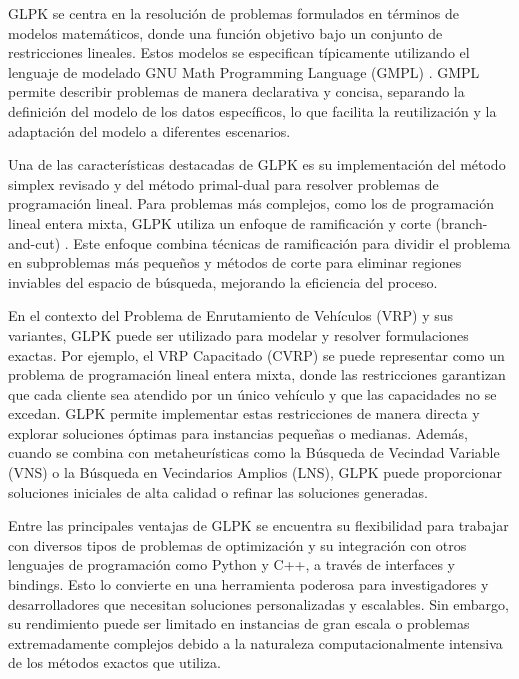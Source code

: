 \documentclass[12pt]{article}
\begin{document}
GLPK se centra en la resolución de problemas formulados en términos de modelos matemáticos, donde una función objetivo  bajo un conjunto de restricciones lineales. Estos modelos se especifican típicamente utilizando el lenguaje de modelado GNU Math Programming Language (GMPL) \agregaesto{[REF]}. GMPL permite describir problemas de manera declarativa y concisa, separando la definición del modelo de los datos específicos, lo que facilita la reutilización y la adaptación del modelo a diferentes escenarios.

Una de las características destacadas de GLPK es su implementación del método simplex revisado y del método primal-dual para resolver problemas de programación lineal. Para problemas más complejos, como los de programación lineal entera mixta, GLPK utiliza un enfoque de ramificación y corte (branch-and-cut) \agregaesto{[REF]}. Este enfoque combina técnicas de ramificación para dividir el problema en subproblemas más pequeños y métodos de corte para eliminar regiones inviables del espacio de búsqueda, mejorando la eficiencia del proceso.


En el contexto del Problema de Enrutamiento de Vehículos (VRP) y sus variantes, GLPK puede ser utilizado para modelar y resolver formulaciones exactas. Por ejemplo, el VRP Capacitado (CVRP) se puede representar como un problema de programación lineal entera mixta, donde las restricciones garantizan que cada cliente sea atendido por un único vehículo y que las capacidades no se excedan. GLPK permite implementar estas restricciones de manera directa y explorar soluciones óptimas para instancias pequeñas o medianas. Además, cuando se combina con metaheurísticas como la Búsqueda de Vecindad Variable (VNS) o la Búsqueda en Vecindarios Amplios (LNS), GLPK puede proporcionar soluciones iniciales de alta calidad o refinar las soluciones generadas.

Entre las principales ventajas de GLPK se encuentra su flexibilidad para trabajar con diversos tipos de problemas de optimización y su integración con otros lenguajes de programación como Python y C++, a través de interfaces y bindings. Esto lo convierte en una herramienta poderosa para investigadores y desarrolladores que necesitan soluciones personalizadas y escalables. Sin embargo, su rendimiento puede ser limitado en instancias de gran escala o problemas extremadamente complejos debido a la naturaleza computacionalmente intensiva de los métodos exactos que utiliza.
\end{document}
